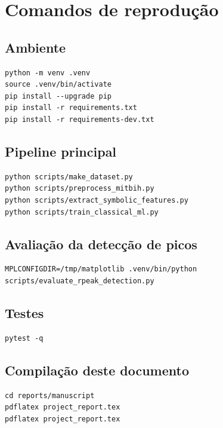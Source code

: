\documentclass[12pt,a4paper]{article}
\begin{document}
\section{Comandos de reprodu\c{c}\~ao}
\subsection{Ambiente}
\begin{verbatim}
python -m venv .venv
source .venv/bin/activate
pip install --upgrade pip
pip install -r requirements.txt
pip install -r requirements-dev.txt
\end{verbatim}

\subsection{Pipeline principal}
\begin{verbatim}
python scripts/make_dataset.py
python scripts/preprocess_mitbih.py
python scripts/extract_symbolic_features.py
python scripts/train_classical_ml.py
\end{verbatim}

\subsection{Avalia\c{c}\~ao da detec\c{c}\~ao de picos}
\begin{verbatim}
MPLCONFIGDIR=/tmp/matplotlib .venv/bin/python scripts/evaluate_rpeak_detection.py
\end{verbatim}

\subsection{Testes}
\begin{verbatim}
pytest -q
\end{verbatim}

\subsection{Compila\c{c}\~ao deste documento}
\begin{verbatim}
cd reports/manuscript
pdflatex project_report.tex
pdflatex project_report.tex
\end{verbatim}
\end{document}
